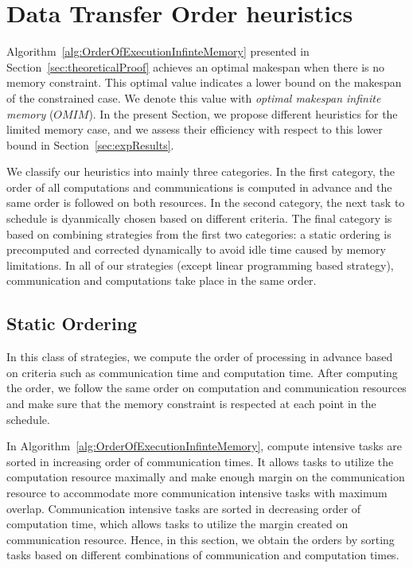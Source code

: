 \documentclass[sigconf]{acmart}
\begin{document}
	
	
	\section{Data Transfer Order heuristics}
	\label{sec:heuristics}
	
	Algorithm~\ref{alg:OrderOfExecutionInfinteMemory} presented in Section~\ref{sec:theoreticalProof} achieves an optimal makespan when there is no memory constraint. This optimal value indicates a lower bound on the makespan of the constrained case. We denote this value with \textit{optimal makespan infinite memory} ($OMIM$). In the present Section, we propose different heuristics for the limited memory case, and we assess their efficiency with respect to this lower bound in Section~\ref{sec:expResults}.
	
	
	We classify our heuristics into mainly three categories. In the first category, the order of all computations and communications is computed in advance and the same order is followed on both resources. In the second category, the next task to schedule is dyanmically chosen based on different criteria. The final category is based on combining strategies from the first two categories: a static ordering is precomputed and corrected dynamically to avoid idle time caused by memory limitations. In all of our strategies (except linear programming based strategy), communication and computations take place in the same order.
	
	\subsection{Static Ordering}
	In this class of strategies, we compute the order of processing in advance based on criteria such as communication time and computation time. After computing the order, we follow the same order on computation and communication resources and make sure that the memory constraint is respected at each point in the schedule.
	
	In Algorithm~\ref{alg:OrderOfExecutionInfinteMemory}, compute intensive tasks are sorted in increasing order of communication times. It allows tasks to utilize the computation resource maximally and make enough margin on the communication resource to accommodate more communication intensive tasks with maximum overlap. Communication intensive tasks are sorted in decreasing order of computation time, which allows tasks to utilize the margin created on communication resource. Hence, in this section, we obtain the orders by sorting tasks based on different combinations of communication and computation times.
	
\end{document}
